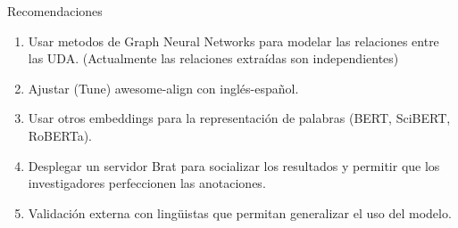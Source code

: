 \begin{recomendations}
    Recomendaciones

    \begin{enumerate}
        \item Usar metodos de Graph Neural Networks para modelar las relaciones entre las UDA. (Actualmente las relaciones extraídas son independientes)
        \item Ajustar (Tune) awesome-align con inglés-español.
        \item Usar otros embeddings para la representación de palabras (BERT, SciBERT, RoBERTa).
        \item Desplegar un servidor Brat para socializar los resultados y permitir que los investigadores perfeccionen las anotaciones.
        \item Validación externa con lingüistas que permitan generalizar el uso del modelo.
    \end{enumerate}
\end{recomendations}
